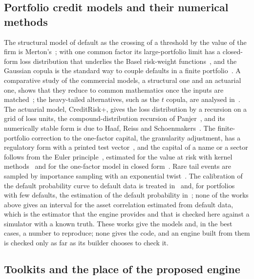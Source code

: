 \subsection{Portfolio credit models and their numerical methods}

The structural model of default as the crossing of a threshold by the value of the firm is Merton's~\citep{merton1974}; with one common factor its large-portfolio limit has a closed-form loss distribution that underlies the Basel risk-weight functions~\citep{gordy2003}, and the Gaussian copula is the standard way to couple defaults in a finite portfolio~\citep{li2000}. A comparative study of the commercial models, a structural one and an actuarial one, shows that they reduce to common mathematics once the inputs are matched~\citep{gordy2000}; the heavy-tailed alternatives, such as the $t$ copula, are analysed in~\citep{frey2003}. The actuarial model, CreditRisk+, gives the loss distribution by a recursion on a grid of loss units, the compound-distribution recursion of Panjer~\citep{panjer1981}, and its numerically stable form is due to Haaf, Reiss and Schoenmakers~\citep{haaf2004}. The finite-portfolio correction to the one-factor capital, the granularity adjustment, has a regulatory form with a printed test vector~\citep{gordylutkebohmert2013}, and the capital of a name or a sector follows from the Euler principle~\citep{tasche2008}, estimated for the value at risk with kernel methods~\citep{tasche2009} and for the one-factor model in closed form~\citep{emmer2005}. Rare tail events are sampled by importance sampling with an exponential twist~\citep{glasserman2005}. The calibration of the default probability curve to default data is treated in~\citep{tasche2013} and, for portfolios with few defaults, the estimation of the default probability in~\citep{pluto2005}; none of the works above gives an interval for the asset correlation estimated from default data, which is the estimator that the engine provides and that is checked here against a simulator with a known truth. These works give the models and, in the best cases, a number to reproduce; none gives the code, and an engine built from them is checked only as far as its builder chooses to check it.

\subsection{Toolkits and the place of the proposed engine}

